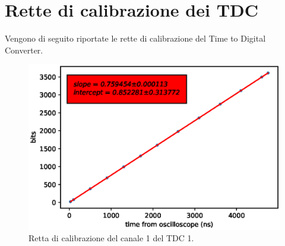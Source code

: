 \begin{figure}[H]
	\centering
	\quad
	\quad
	\quad
	\quad
\end{figure}
\chapter{Rette di calibrazione dei TDC}               %
Vengono di seguito riportate le rette di calibrazione del Time to Digital Converter.

\begin{figure}[H]
  \centering
  \includegraphics[width=.8\textwidth]{plots/tdc11.eps}
  \caption{Retta di calibrazione del canale 1 del TDC 1.}
  \label{fig:tdc11}
\end{figure}

